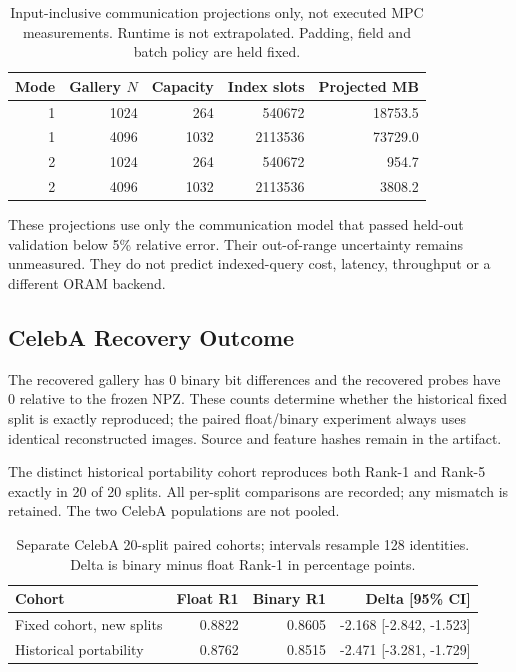 \begin{table}[H]
\caption{Input-inclusive communication projections only, not executed MPC measurements. Runtime is not extrapolated. Padding, field and batch policy are held fixed.}
\label{tab:projections}\centering\small
\setlength{\tabcolsep}{3pt}
\begin{tabular}{rrrrr}
\toprule
Mode & Gallery $N$ & Capacity & Index slots & Projected MB \\
\midrule
1 & 1024 & 264 & 540672 & 18753.5 \\
1 & 4096 & 1032 & 2113536 & 73729.0 \\
2 & 1024 & 264 & 540672 & 954.7 \\
2 & 4096 & 1032 & 2113536 & 3808.2 \\
\bottomrule
\end{tabular}
\end{table}

These projections use only the communication model that passed held-out validation below 5\% relative error. Their out-of-range uncertainty remains unmeasured. They do not predict indexed-query cost, latency, throughput or a different ORAM backend.

\subsection{CelebA Recovery Outcome}\label{suppsec:generated_supplement:2}

The recovered gallery has 0 binary bit differences and the recovered probes have 0 relative to the frozen NPZ. These counts determine whether the historical fixed split is exactly reproduced; the paired float/binary experiment always uses identical reconstructed images. Source and feature hashes remain in the artifact.

The distinct historical portability cohort reproduces both Rank-1 and Rank-5 exactly in 20 of 20 splits. All per-split comparisons are recorded; any mismatch is retained. The two CelebA populations are not pooled.

\begin{table}[H]
\caption{Separate CelebA 20-split paired cohorts; intervals resample 128 identities. Delta is binary minus float Rank-1 in percentage points.}
\label{tab:celeba_cohorts}\centering\small
\setlength{\tabcolsep}{3pt}
\begin{tabular}{lrrr}
\toprule
Cohort & Float R1 & Binary R1 & Delta [95\% CI] \\
\midrule
Fixed cohort, new splits & 0.8822 & 0.8605 & -2.168 [-2.842, -1.523] \\
Historical portability & 0.8762 & 0.8515 & -2.471 [-3.281, -1.729] \\
\bottomrule
\end{tabular}
\end{table}

